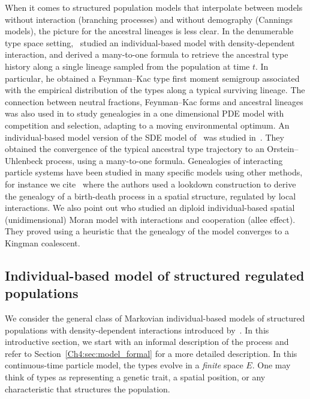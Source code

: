 \begin{refsegment}
When it comes to structured population models that interpolate between models without interaction (branching processes) and without demography (Cannings models), the picture for the ancestral lineages is less clear. In the denumerable type space setting,~\cite{Bansaye} studied an individual-based model with density-dependent interaction, and derived a many-to-one formula to retrieve the ancestral type history along a single lineage sampled from the population at time $t$. In particular, he obtained a Feynman--Kac type first moment semigroup associated with the empirical distribution of the types along a typical surviving lineage. The connection between neutral fractions, Feynman--Kac forms and ancestral lineages was also used in \citet{forien_ancestral_2022} to study genealogies in a one dimensional PDE model with competition and selection, adapting to a moving environmental optimum.
An individual-based model version of the SDE model of~\cite{forien_ancestral_2022} was studied in~\cite{meleard-tran}. They obtained the convergence of the typical ancestral type trajectory to an Orstein--Uhlenbeck process, using a many-to-one formula. 
 Genealogies of interacting particle systems have been studied in many specific models using other methods, for instance we cite~\cite{alison_m_etheridge_looking_2024} where the authors used a lookdown construction to derive the genealogy of a birth-death process in a spatial structure, regulated by local interactions. We also point out \cite{etheridge_genealogies_2022} who studied an diploid individual-based spatial (unidimensional) Moran model with interactions and cooperation (allee effect). They proved using a heuristic that the genealogy of the model converges to a Kingman coalescent.

\subsection{Individual-based model of structured regulated populations}\label{Ch4:sec:model}
We consider the general class of Markovian individual-based models of structured populations with density-dependent interactions introduced by~\cite{Kurtz:1978aa}. In this introductive section, we start with an informal description of the process and refer to Section~\ref{Ch4:sec:model_formal} for a more detailed description.
In this continuous-time particle model, the types evolve in a \emph{finite} space $E$. One may think of types as representing a genetic trait, a spatial position, or any characteristic that structures the population. 


\end{refsegment}
